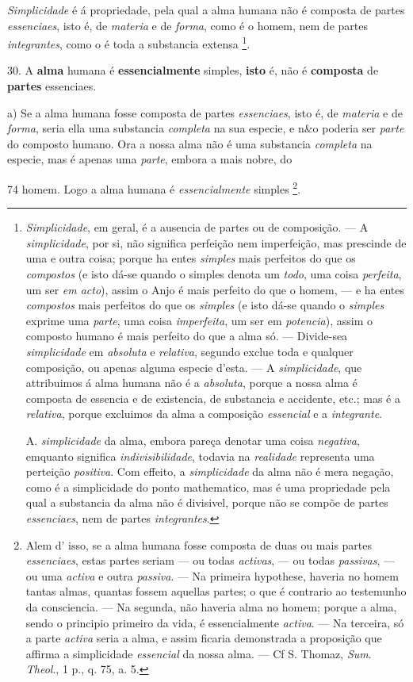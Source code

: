 
\emph{Simplicidade} é á propriedade, pela qual a alma humana não é composta de partes \emph{essenciaes}, isto é, de \emph{materia} e de \emph{forma}, como é o homem, nem de partes \emph{integrantes}, como o é toda a substancia extensa \footnote{\emph{Simplicidade}, em geral, é a ausencia de partes ou de composição. --- A \emph{simplicidade}, por si, não significa perfeição nem imperfeição, mas prescinde de uma e outra coisa; porque ha entes \emph{simples} mais perfeitos do que os \emph{compostos} (e isto dá-se quando o simples denota um \emph{todo}, uma coisa \emph{perfeita}, um ser \emph{em acto}), assim o Anjo é mais perfeito do que o homem, --- e ha entes \emph{compostos} mais perfeitos do que os \emph{simples} (e isto dá-se quando o \emph{simples} exprime uma \emph{parte}, uma coisa \emph{imperfeita}, um ser em \emph{potencia}), assim o composto humano é mais perfeito do que a alma só. --- Divide-sea \emph{simplicidade} em \emph{absoluta} e \emph{relativa}, segundo exclue toda e qualquer composição, ou apenas alguma especie d'esta. --- A \emph{simplicidade}, que attribuimos á alma humana não é a \emph{absoluta}, porque a nossa alma é composta de essencia e de existencia, de substancia e accidente, etc.; mas é a \emph{relativa}, porque excluimos da alma a composição \emph{essencial} e a \emph{integrante}.\par A. \emph{simplicidade} da alma, embora pareça denotar uma coisa \emph{negativa}, emquanto significa \emph{indivisibilidade}, todavia na \emph{realidade} representa uma perteição \emph{positiva}. Com effeito, a \emph{simplicidade} da alma não é mera negação, como é a simplicidade do ponto mathematico, mas é uma propriedade pela qual a substancia da alma não é divisivel, porque não se compõe de partes \emph{essenciaes}, nem de partes \emph{integrantes}.}.

30. A \textbf{alma} humana é \textbf{essencialmente} simples, \textbf{isto} é, não é \textbf{composta} de \textbf{partes} essenciaes. \textbar{}

a) Se a alma humana fosse composta de partes \emph{essenciaes}, isto é, de \emph{materia} e de \emph{forma}, seria ella uma substancia   \emph{completa} na sua especie, e n\&o poderia ser \emph{parte} do composto humano. Ora a nossa alma não é uma substancia \emph{completa} na especie, mas é apenas uma \emph{parte}, embora a mais nobre, do

74 homem. Logo a alma humana é \emph{essencialmente} simples \footnote{Alem d' isso, se a alma humana fosse composta de duas ou mais partes \emph{essenciaes}, estas partes seriam --- ou todas \emph{activas}, --- ou todas \emph{passivas}, --- ou uma \emph{activa} e outra \emph{passiva}. --- Na primeira hypothese, haveria no homem tantas almas, quantas fossem aquellas partes; o que é contrario ao testemunho da consciencia. --- Na segunda, não haveria alma no homem; porque a alma, sendo o principio primeiro da vida, é essencialmente \emph{activa}. --- Na terceira, só a parte \emph{activa} seria a alma, e assim ficaria demonstrada a proposição que affirma a simplicidade \emph{essencial} da nossa alma. --- Cf S. Thomaz, \emph{Sum}. \emph{Theol}., 1 p., q. 75, a. 5.}.

